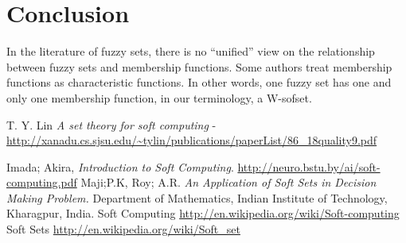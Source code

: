 \documentclass[12pt]{article} %
\begin{document}
\section{Conclusion}
In the literature of fuzzy sets, there is no “unified”
view on the relationship between fuzzy sets and
membership functions. Some authors treat membership
functions as characteristic functions. In other words,
one fuzzy set has one and only one membership
function, in our terminology, a W-sofset.
\begin{thebibliography}{9}
T. Y. Lin
\emph{A set theory for soft computing} - \url{http://xanadu.cs.sjsu.edu/~tylin/publications/paperList/86_18quality9.pdf}


Imada; Akira, 
\emph{Introduction to Soft Computing}. \url{http://neuro.bstu.by/ai/soft-computing.pdf}
Maji;P.K, Roy; A.R. \textit{An Application of Soft Sets in Decision Making Problem.}
Department of Mathematics, Indian Institute of Technology, Kharagpur, India.
 Soft Computing
 \url{http://en.wikipedia.org/wiki/Soft-computing}
 Soft Sets
 \url{http://en.wikipedia.org/wiki/Soft_set}
\end{thebibliography}
\newpage
%
\end{document}
